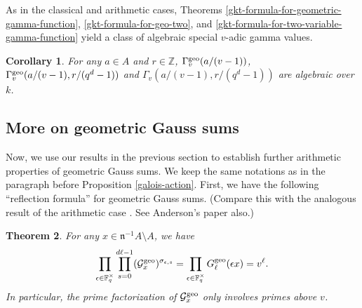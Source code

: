 \documentclass[11pt]{amsart}
\theoremstyle{plain}
\newtheorem{thm}{Theorem}[subsection]
\newtheorem{cor}[thm]{Corollary}
\theoremstyle{definition}
\theoremstyle{remark}
\numberwithin{equation}{section}
\newcommand{\ZZ}{\mathbb{Z}}
\newcommand{\FF}{\mathbb{F}}
\newcommand{\nfk}{\mathfrak{n}}
\newcommand{\Gcal}{\mathcal{G}}
\newcommand{\Fqst}{\FF_q^\times}
\newcommand{\vgg}{\Gamma_v^{\textnormal{geo}}}
\newcommand{\vtg}{\Gamma_v}
\newcommand{\bggs}{\Gcal^{\textnormal{geo}}}
\newcommand{\ggs}{G_\l^{\textnormal{geo}}}
\let\l\ell
\begin{document}
	As in the classical and arithmetic cases, Theorems \ref{gkt-formula-for-geometric-gamma-function}, \ref{gkt-formula-for-geo-two}, and \ref{gkt-formula-for-two-variable-gamma-function} yield a class of algebraic special $v$-adic gamma values.
	
	\begin{cor}
		For any $a \in A$ and $r \in \ZZ$, $\vgg(a/(v-1))$, $\vgg(a/(v-1),r/(q^d-1))$ and $\vtg(a/(v-1),r/(q^d-1))$ are algebraic over $k$.
	\end{cor}
	
	\subsection{More on geometric Gauss sums}    \label{section-more-on-geometric-gauss-sums}
	
	Now, we use our results in the previous section to establish further arithmetic properties of geometric Gauss sums.
	We keep the same notations as in the paragraph before Proposition \ref{galois-action}.
	First, we have the following “reflection formula” for geometric Gauss sums.
	(Compare this with the analogous result of the arithmetic case \cite[Section 2]{thakur1993behaviour}.
	See Anderson's paper \cite[]{anderson1992twodimensional} also.)
	
	\begin{thm}    \label{gauss-sum-lies-above-v}
		For any $x \in \nfk^{-1}A \setminus A$, we have
		$$
		\prod_{\epsilon \in \Fqst} \prod_{s=0}^{d\l-1} (\bggs_x)^{\sigma_{\epsilon,s}}
		=\prod_{\epsilon \in \Fqst} \ggs(\epsilon x)
		= v^\l.
		$$
		In particular, the prime factorization of $\bggs_x$ only involves primes above $v$.
	\end{thm}
	
\end{document}
